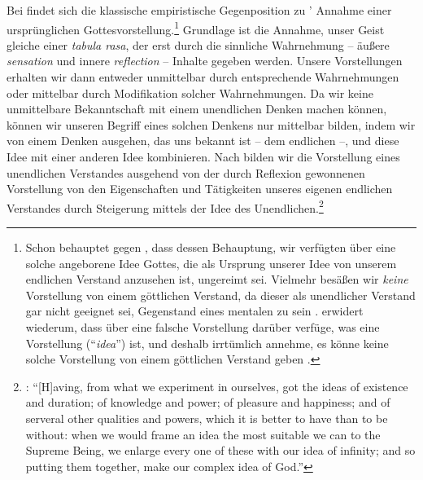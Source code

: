 Bei  findet sich die klassische
empiristische Gegenposition zu '
Annahme einer ursprünglichen Gottesvorstellung.\footnote{Schon
 behauptet gegen
, dass dessen Behauptung, wir
verfügten über eine solche angeborene Idee Gottes, die als Ursprung unserer Idee
von unserem endlichen Verstand anzusehen ist, ungereimt sei. Vielmehr besäßen
wir \emph{keine} Vorstellung von einem göttlichen Verstand, da dieser als
unendlicher Verstand gar nicht geeignet sei, Gegenstand eines mentalen
 zu sein \parencite[vgl.][VII:
183.4--19]{Descartes:OeuvresdeDescartes1983}.
 erwidert wiederum, dass
 über eine falsche Vorstellung darüber verfüge,
was eine Vorstellung (\enquote{\emph{idea}}) ist, und deshalb irrtümlich
annehme, es könne keine solche Vorstellung von einem göttlichen Verstand
geben \parencite[Vgl.][VII: 183.22--25]{Descartes:OeuvresdeDescartes1983}.}
Grundlage ist die Annahme, unser Geist gleiche einer \emph{tabula rasa}, der erst durch die sinnliche Wahrnehmung
-- äußere \emph{sensation} und innere \emph{reflection} -- Inhalte gegeben
werden. Unsere Vorstellungen erhalten wir dann entweder unmittelbar durch
entsprechende Wahrnehmungen oder mittelbar durch Modifikation solcher
Wahrnehmungen. Da wir keine unmittelbare Bekanntschaft mit einem unendlichen
Denken machen können, können wir unseren Begriff eines solchen Denkens nur
mittelbar bilden, indem wir von einem Denken ausgehen, das uns bekannt ist --
dem endlichen --, und diese Idee mit einer anderen Idee kombinieren. Nach
 bilden wir die Vorstellung eines
unendlichen Verstandes ausgehend von der durch Reflexion gewonnenen Vorstellung
von den Eigenschaften und Tätigkeiten unseres eigenen endlichen Verstandes durch
Steigerung mittels der Idee des Unendlichen.\footnote{\cite[Vgl.][II:
31]{Locke:TheWorksofJohnLocke1963}: \enquote{[H]aving, from what we experiment
in ourselves, got the ideas of existence and duration; of knowledge and power;
of pleasure and happiness; and of serveral other qualities and powers, which it
is better to have than to be without: when we would frame an idea the most
suitable we can to the Supreme Being, we enlarge every one of these with our
idea of infinity; and so putting them together, make our complex idea of God.}}


